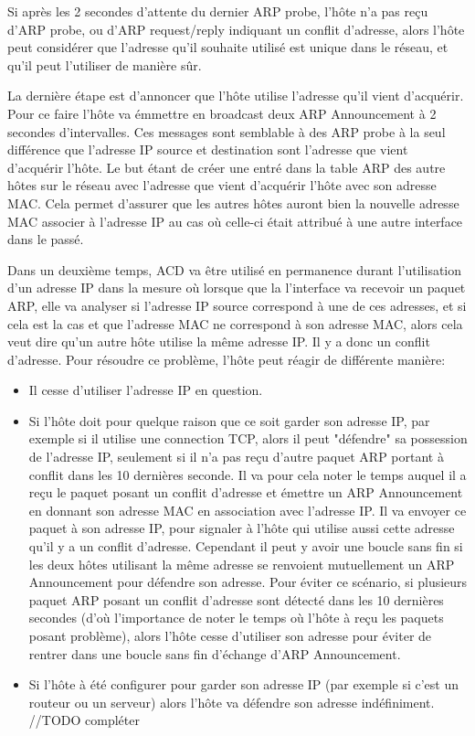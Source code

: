 Si après les 2 secondes d'attente du dernier ARP probe, l'hôte n'a pas reçu d'ARP probe,
ou d'ARP request/reply indiquant un conflit d'adresse, alors l'hôte peut considérer que
l'adresse qu'il souhaite utilisé est unique dans le réseau, et qu'il peut l'utiliser de
manière sûr.

La dernière étape est d'annoncer que l'hôte utilise l'adresse qu'il vient d'acquérir.
Pour ce faire l'hôte va émmettre en broadcast deux ARP Announcement à 2 secondes d'intervalles.
Ces messages sont semblable à des ARP probe à la seul différence que l'adresse IP source
et destination sont l'adresse que vient d'acquérir l'hôte.
Le but étant de créer une entré dans la table ARP des autre hôtes sur le réseau avec l'adresse
que vient d'acquérir l'hôte avec son adresse MAC. Cela permet d'assurer que les autres hôtes
auront bien la nouvelle adresse MAC associer à l'adresse IP au cas où celle-ci était attribué à
une autre interface dans le passé.


Dans un deuxième temps, ACD va être utilisé en permanence durant l'utilisation d'un adresse IP
dans la mesure où lorsque que la l'interface va recevoir un paquet ARP, elle va analyser
si l'adresse IP source correspond à une de ces adresses, et si cela est la cas et que l'adresse
MAC ne correspond à son adresse MAC, alors cela veut dire qu'un autre hôte utilise la même
adresse IP. Il y a donc un conflit d'adresse.
Pour résoudre ce problème, l'hôte peut réagir de différente manière:
\begin{itemize}
\item Il cesse d'utiliser l'adresse IP en question.
\item Si l'hôte doit pour quelque raison que ce soit garder son adresse IP, par exemple si il
utilise une connection TCP, alors il peut "défendre" sa possession de l'adresse IP, seulement si
il n'a pas reçu d'autre paquet ARP portant à conflit dans les 10 dernières seconde.
Il va pour cela noter le temps auquel il a reçu le paquet posant un conflit d'adresse et émettre un ARP Announcement en donnant son adresse MAC en association avec
l'adresse IP. Il va envoyer ce paquet à son adresse IP, pour signaler à l'hôte qui utilise
aussi cette adresse qu'il y a un conflit d'adresse. Cependant il peut y avoir une boucle sans
fin si les deux hôtes utilisant la même adresse se renvoient mutuellement un ARP Announcement
pour défendre son adresse. Pour éviter ce scénario, si plusieurs paquet ARP posant un conflit
d'adresse sont détecté dans les 10 dernières secondes (d'où l'importance de noter le temps où l'hôte à reçu les paquets posant problème), alors l'hôte cesse d'utiliser son adresse
pour éviter de rentrer dans une boucle sans fin d'échange d'ARP Announcement.
\item Si l'hôte à été configurer pour garder son adresse IP (par exemple si c'est un routeur
ou un serveur) alors l'hôte va défendre son adresse indéfiniment. //TODO compléter
\end{itemize}


